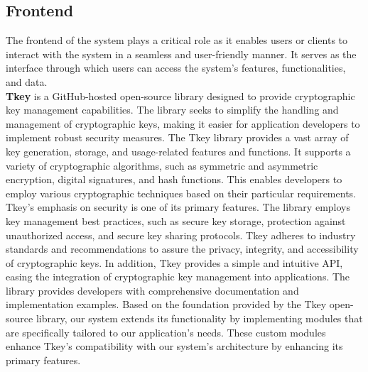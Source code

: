 \documentclass[../Main.tex]{subfiles}
\begin{document}
\subsection{Frontend}
The frontend of the system plays a critical role as it enables users or clients to interact with the system in a seamless and user-friendly manner. It serves as the interface through which users can access the system's features, functionalities, and data.\\

\textbf{Tkey} is a GitHub-hosted open-source library designed to provide cryptographic key management capabilities. The library seeks to simplify the handling and management of cryptographic keys, making it easier for application developers to implement robust security measures. The Tkey library provides a vast array of key generation, storage, and usage-related features and functions. It supports a variety of cryptographic algorithms, such as symmetric and asymmetric encryption, digital signatures, and hash functions. This enables developers to employ various cryptographic techniques based on their particular requirements. Tkey's emphasis on security is one of its primary features. The library employs key management best practices, such as secure key storage, protection against unauthorized access, and secure key sharing protocols. Tkey adheres to industry standards and recommendations to assure the privacy, integrity, and accessibility of cryptographic keys. In addition, Tkey provides a simple and intuitive API, easing the integration of cryptographic key management into applications. The library provides developers with comprehensive documentation and implementation examples.
\indent Based on the foundation provided by the Tkey open-source library, our system extends its functionality by implementing modules that are specifically tailored to our application's needs. These custom modules enhance Tkey's compatibility with our system's architecture by enhancing its primary features.
\end{document}
